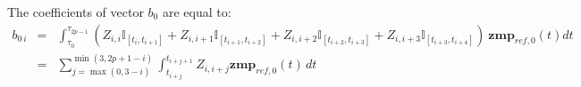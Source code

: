 \documentclass {article}
\newcommand\zmprefx{\mathbf{zmp}_{ref, 0}}
\begin{document}
The coefficients of vector $b_0$ are equal to:
\begin{eqnarray*}
  b_{0\,i} &=& \int_{\tau_0}^{\tau_{2p-1}}(Z_{i, i} \mathbb{I}_{[t_i, t_{i+1}]} + Z_{i,i+1} \mathbb{I}_{[t_{i+1}, t_{i+2}]} +Z_{i,i+2} \mathbb{I}_{[t_{i+2}, t_{i+3}]}+Z_{i,i+3} \mathbb{I}_{[t_{i+3}, t_{i+4}]})\ \zmprefx(t)dt \\
  &=& \sum_{j=\max(0,3-i)}^{\min(3,2p+1-i)} \int_{t_{i+j}}^{t_{i+j+1}} Z_{i,i+j} \zmprefx(t)\,dt
\end{eqnarray*}
\end{document}

